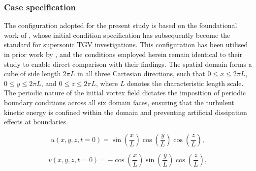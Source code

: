 
\subsubsection{Case specification}

The configuration adopted for the present study is based on the foundational work of \citep{DeBonis2013}, whose initial condition specification has subsequently become the standard for supersonic \gls{TGV} investigations. This configuration has been utilised in prior work by \citep{LusherSandham2021}, and the conditions employed herein remain identical to their study to enable direct comparison with their findings. The spatial domain forms a cube of side length $2\pi L$ in all three Cartesian directions, such that $0 \leq x \leq 2\pi L$, $0 \leq y \leq 2\pi L$, and $0 \leq z \leq 2\pi L$, where $L$ denotes the characteristic length scale. The periodic nature of the initial vortex field dictates the imposition of periodic boundary conditions across all six domain faces, ensuring that the turbulent kinetic energy is confined within the domain and preventing artificial dissipation effects at boundaries.


\begin{equation}
u(x,y,z,t=0) = \sin\left(\frac{x}{L}\right)\cos\left(\frac{y}{L}\right)\cos\left(\frac{z}{L}\right),
\end{equation}

\begin{equation}
v(x,y,z,t=0) = -\cos\left(\frac{x}{L}\right)\sin\left(\frac{y}{L}\right)\cos\left(\frac{z}{L}\right),
\end{equation}

